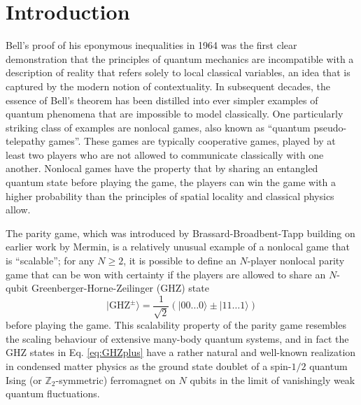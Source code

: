 \documentclass[prb,twocolumn,showpacs,amssymb,superscriptaddress]{revtex4-2}
\begin{document}
\section{Introduction}
Bell's proof\cite{bell1964einstein} of his eponymous inequalities in 1964 was the first clear demonstration that the principles of quantum mechanics are incompatible with a description of reality that refers solely to local classical variables, an idea that is captured by the modern notion of contextuality\cite{Spekkens_2008,Abramsky_2011}. In subsequent decades, the essence of Bell's theorem has been distilled into ever simpler examples of quantum phenomena that are impossible to model classically. One particularly striking class of examples are nonlocal games, also known as ``quantum pseudo-telepathy games''\cite{Brassard2005}. These games are typically cooperative games, played by at least two players who are not allowed to communicate classically with one another.  Nonlocal games have the property that by sharing an entangled quantum state before playing the game, the players can win the game with a higher probability than the principles of spatial locality and classical physics allow.

The parity game, which was introduced by Brassard-Broadbent-Tapp\cite{brassard2005recasting} building on earlier work by Mermin\cite{mermin1990extreme}, is a relatively unusual example of a nonlocal game that is  ``scalable''\cite{Brassard2005}; for any $N \geq 2$, it is possible to define an $N$-player nonlocal parity game that can be won with certainty if the players are allowed to share an $N$-qubit Greenberger-Horne-Zeilinger (GHZ) state
\begin{equation}
\label{eq:GHZplus}
|\mathrm{GHZ}^{\pm}\rangle  = \frac{1}{\sqrt{2}}\left(|00 \ldots 0\rangle \pm |11\ldots 1\rangle\right)
\end{equation}
before playing the game.   This scalability property of the parity game resembles the scaling behaviour of extensive many-body quantum systems, and in fact the GHZ states in Eq. \eqref{eq:GHZplus} have a rather natural and well-known realization in condensed matter physics as the ground state doublet of a spin-$1/2$ quantum Ising (or $\mathbb{Z}_2$-symmetric) ferromagnet on $N$ qubits in the limit of vanishingly weak quantum fluctuations. 
\end{document}
